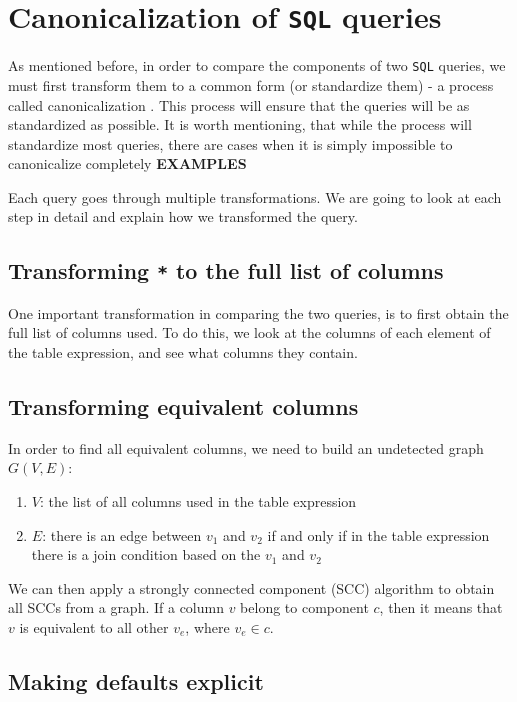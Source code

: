 \section{Canonicalization of \texttt{SQL} queries}

As mentioned before, in order to compare the components of two \texttt{SQL} queries, we must first transform them to a common form (or standardize them) - a process called canonicalization \citep{literature:xdata}. This process will ensure that the queries will be as standardized as possible. It is worth mentioning, that while the process will standardize most queries, there are cases when it is simply impossible to canonicalize completely \textbf{EXAMPLES}

Each query goes through multiple transformations. We are going to look at each step in detail and explain how we transformed the query.

\subsection{Transforming \texttt{*} to the full list of columns}

One important transformation in comparing the two queries, is to first obtain the full list of columns used. To do this, we look at the columns of each element of the table expression, and see what columns they contain. 

\subsection{Transforming equivalent columns}

In order to find all equivalent columns, we need to build an undetected graph $G(V, E)$:

\begin{enumerate}
    \item $V$: the list of all columns used in the table expression
    \item $E$: there is an edge between $v_1$ and $v_2$ if and only if in the table expression there is a join condition based on the $v_1$ and $v_2$
\end{enumerate}

We can then apply a strongly connected component (SCC) algorithm to obtain all SCCs from a graph. If a column $v$ belong to component $c$, then it means that $v$ is equivalent to all other $v_e$, where $v_e \in c$.

\subsection{Making defaults explicit}

